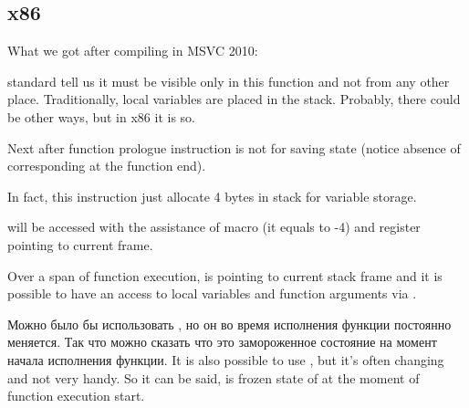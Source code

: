 ﻿\subsection{x86}

{What we got after compiling in MSVC 2010:}




{\CCpp standard tell us it must be visible only in this function and not from any other place. 
Traditionally, local variables are placed in the stack. 
Probably, there could be other ways, but in x86 it is so.}

{Next after function prologue instruction  is not for saving \ECX state 
(notice absence of corresponding  at the function end).}

{In fact, this instruction just allocate 4 bytes in stack for  variable storage.} 

{ will be accessed with the assistance of  macro 
(it equals to -4) and \EBP register pointing to current frame.}

{Over a span of function execution, \EBP is pointing to current stack frame and it is possible 
to have an access to local variables and function arguments via .}

\IFRU
{Можно было бы использовать \ESP, но он во время исполнения функции постоянно меняется. 
Так что можно сказать что \EBP это замороженное состояние \ESP на момент начала исполнения функции.}
{It is also possible to use \ESP, but it's often changing and not very handy.
So it can be said, \EBP is frozen state of \ESP at the moment of function execution start.}

